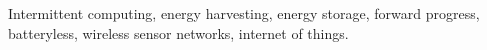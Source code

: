 \documentclass[journal, twoside]{IEEEtran}
\begin{document}


\begin{IEEEkeywords}
Intermittent computing, energy harvesting, energy storage, forward progress, batteryless, wireless sensor networks, internet of things.
\end{IEEEkeywords}



%
\IEEEpeerreviewmaketitle
\end{document}
